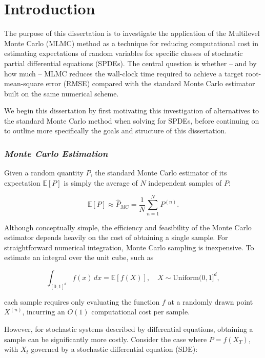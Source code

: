 \section{Introduction}\label{sec:introduction}

The purpose of this dissertation is to investigate the application of 
the Multilevel Monte Carlo (MLMC) method as a technique for 
reducing computational cost in estimating expectations 
of random variables for specific classes of 
stochastic partial differential equations (SPDEs).  The central question 
is whether -- and by how much -- MLMC reduces the wall-clock time required 
to achieve a target root-mean-square error (RMSE) compared with the 
standard Monte Carlo estimator built on the same numerical scheme.

We begin this dissertation by first motivating this investigation of 
alternatives to the standard Monte Carlo method when solving for SPDEs, 
before continuing on to outline more specifically the goals and structure
of this dissertation.

\subsubsection*{\textit{Monte Carlo Estimation}}

Given a random quantity $P$, the standard Monte Carlo estimator of its 
expectation $\mathbb{E}[P]$ is simply the average of $N$ independent 
samples of $P$:

\begin{equation*}
    \mathbb{E}[P] \approx \hat{P}_{MC} = \frac{1}{N} \sum_{n=1}^N P^{(n)}.
\end{equation*}

Although conceptually simple, the efficiency and feasibility of the Monte Carlo 
estimator depends heavily on the cost of obtaining a single sample. For straightforward
numerical integration, Monte Carlo sampling is inexpensive. To estimate 
an integral over the unit cube, such as 

\begin{equation*}
    \int_{[0,1]^d} f(x)\,dx = \mathbb{E}[f(X)], \quad X\sim\text{Uniform}(0,1]^d,
\end{equation*}

each sample requires only evaluating the function $f$ at a randomly drawn point $X^{(n)}$,
incurring an $O(1)$ computational cost per sample.

However, for stochastic systems described by differential equations, obtaining a 
sample can be significantly more costly. Consider the case where $P=f(X_T)$, with 
$X_t$ governed by a stochastic differential equation (SDE):

